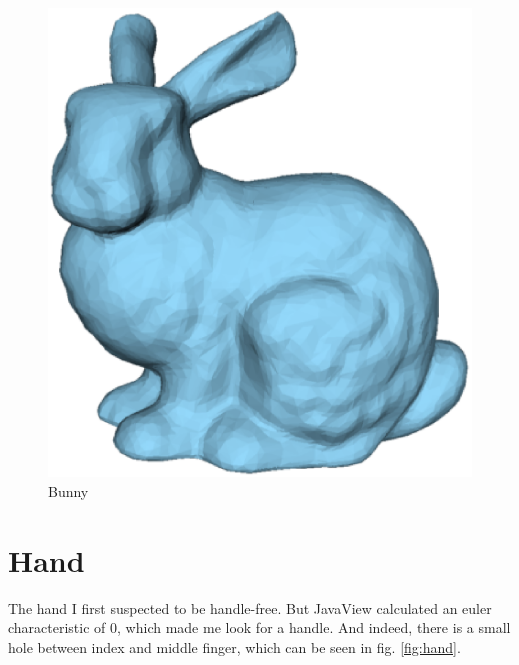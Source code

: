 \documentclass[a4paper,10pt,notitlepage]{scrreprt}
\begin{document}
\begin{figure}
  \centering

  \includegraphics[scale=0.5]{bunny.eps}

  \caption{Bunny}
  \label{fig:bunny}
\end{figure}

\section{Hand}

The hand I first suspected to be handle-free. But JavaView calculated an euler
characteristic of $0$, which made me look for a handle. And indeed, there is a
small hole between index and middle finger, which can be seen in fig.
\ref{fig:hand}.
\end{document}

